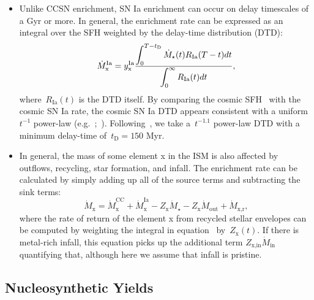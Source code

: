\documentclass[ms.tex]{subfiles}
\begin{document}
\begin{itemize}
	\item Unlike CCSN enrichment, SN Ia enrichment can occur on delay
	timescales of a Gyr or more.
	In general, the enrichment rate can be expressed as an integral over the
	SFH weighted by the delay-time distribution (DTD):
	\begin{equation}
	\dot{M}_\text{x}^\text{Ia} = y_\text{x}^\text{Ia} \frac{\displaystyle{
		\int_0^{T - t_\text{D}} \dot{M}_\star(t) R_\text{Ia}(T - t) dt
	}}{\displaystyle{
		\int_0^\infty R_\text{Ia}(t) dt
	}},
	\end{equation}
	where~$R_\text{Ia}(t)$ is the DTD itself.
	By comparing the cosmic SFH~\citep[e.g.][]{Madau2014} with the cosmic SN
	Ia rate, the cosmic SN Ia DTD appears consistent with a uniform~$t^{-1}$
	power-law (e.g.~\citealp{Maoz2012a};~\citealp*{Maoz2012b, Graur2013}).
	Following~\citet{Weinberg2017}, we take a~$t^{-1.1}$ power-law DTD with a
	minimum delay-time of~$t_\text{D} = 150$ Myr.

	\item In general, the mass of some element x in the ISM is also affected by
	outflows, recycling, star formation, and infall.
	The enrichment rate can be calculated by simply adding up all of the source
	terms and subtracting the sink terms:
	\begin{equation}
	\label{eq:enrichment_eq}
	\dot{M}_\text{x} = \dot{M}_\text{x}^\text{CC} + \dot{M}_\text{x}^\text{Ia}
	- Z_\text{x}\dot{M}_\star - Z_\text{x}\dot{M}_\text{out} +
	\dot{M}_\text{x,r},
	\end{equation}
	where the rate of return of the element x from recycled stellar envelopes
	can be computed by weighting the integral in equation~
	by~$Z_\text{x}(t)$.
	If there is metal-rich infall, this equation picks up the additional term
	$Z_\text{x,in}\dot{M}_\text{in}$ quantifying that, although here we assume
	that infall is pristine.

\end{itemize}

\subsection{Nucleosynthetic Yields}
\label{sec:onezone:yields}
\end{document}
